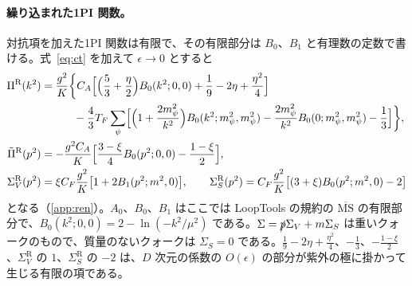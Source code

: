 \documentclass[a4paper,10pt]{ltjsarticle}
\newcommand{\MSbar}{\overline{\mathrm{MS}}}
\begin{document}
\paragraph{繰り込まれた1PI 関数。}対抗項を加えた1PI 関数は有限で、その有限部分は $B_0$、$B_1$ と有理数の定数で書ける。式~\eqref{eq:ct} を加えて $\epsilon\to0$ とすると
\begin{equation}
\begin{aligned}
\Pi^{\mathrm R}(k^2)&=\frac{g^2}{K}\biggl\{C_A\Bigl[\Bigl(\frac53+\frac\eta2\Bigr)B_0(k^2;0,0)+\frac19-2\eta+\frac{\eta^2}{4}\Bigr]\\
&\hspace{3em}-\frac43T_F\sum_\psi\Bigl[\Bigl(1+\frac{2m_\psi^2}{k^2}\Bigr)B_0(k^2;m_\psi^2,m_\psi^2)-\frac{2m_\psi^2}{k^2}B_0(0;m_\psi^2,m_\psi^2)-\frac13\Bigr]\biggr\},\\
\tilde\Pi^{\mathrm R}(p^2)&=-\frac{g^2C_A}{K}\Bigl[\frac{3-\xi}4B_0(p^2;0,0)-\frac{1-\xi}{2}\Bigr],\\
\Sigma_V^{\mathrm R}(p^2)&=\xi C_F\frac{g^2}{K}\bigl[1+2B_1(p^2;m^2,0)\bigr],\qquad
\Sigma_S^{\mathrm R}(p^2)=C_F\frac{g^2}{K}\bigl[(3+\xi)B_0(p^2;m^2,0)-2\bigr]
\end{aligned}
\label{eq:VR}
\end{equation}
となる（\ref{app:ren}）。$A_0$、$B_0$、$B_1$ はここでは LoopTools の規約の $\MSbar$ の有限部分で、$B_0(k^2;0,0)=2-\ln(-k^2/\mu^2)$ である。$\Sigma=\slashed p\Sigma_V+m\Sigma_S$ は重いクォークのもので、質量のないクォークは $\Sigma_S=0$ である。$\frac19-2\eta+\frac{\eta^2}4$、$-\frac13$、$-\frac{1-\xi}2$、$\Sigma_V^{\mathrm R}$ の $1$、$\Sigma_S^{\mathrm R}$ の $-2$ は、$D$ 次元の係数の $O(\epsilon)$ の部分が紫外の極に掛かって生じる有限の項である。
\end{document}

